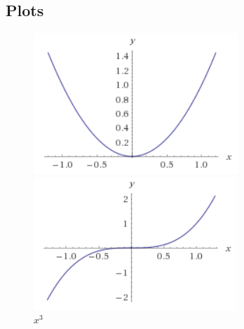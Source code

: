 \subsection{Plots}
\begin{figure}[h]
	\centering
	\begin{minipage}[t]{0.4\textwidth}
		\centering
		\includegraphics[width=\textwidth]{images/graph_x_2}
		\caption{$x^2$}
	\end{minipage}
	\begin{minipage}[t]{0.4\textwidth}
		\centering
		\includegraphics[width=\textwidth]{images/graph_x_3}
		\caption{$x^3$}
 	\end{minipage}
\end{figure}

